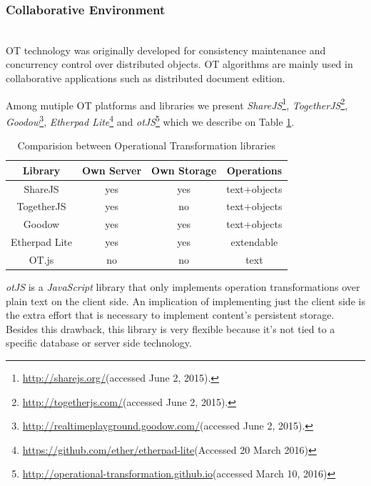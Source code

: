 \documentclass[conference,compsoc,a4paper]{IEEEtran}
\begin{document}
  \subsubsection{Collaborative Environment}\label{collabenv}~\\

        \gls{OT} technology was originally developed for consistency maintenance and concurrency control over distributed objects.
        \gls{OT} algorithms are mainly used in collaborative applications such as distributed document edition.

	Among mutiple \gls{OT} platforms and libraries we present \emph{ShareJS}\footnote{\url{http://sharejs.org/}(accessed June 2, 2015).}, \emph{TogetherJS}\footnote{\url{http://togetherjs.com/}(accessed June 2, 2015).}, \emph{Goodow}\footnote{\url{http://realtimeplayground.goodow.com/}(accessed June 2, 2015).}, \emph{Etherpad Lite}\footnote{\url{https://github.com/ether/etherpad-lite}(Accessed 20 March 2016)} and \emph{otJS}\footnote{\url{http://operational-transformation.github.io}(accessed March 10, 2016)} which we describe on Table \ref{table:otcomparision}.

\begin{table}
\centering
\caption{Comparision between Operational Transformation libraries}
\label{table:otcomparision}
\begin{tabular}{|c|c|c|c|}
\hline
\textbf{Library} & \textbf{Own Server} & \textbf{Own Storage} & \textbf{Operations} \\ \hline
ShareJS          & yes                 & yes                  & text+objects        \\ \hline
TogetherJS       & yes                 & no                   & text+objects        \\ \hline
Goodow           & yes                 & yes                  & text+objects        \\ \hline
Etherpad Lite    & yes                 & yes                  & extendable 			    \\ \hline
OT.js            & no                  & no                   & text                \\ \hline
\end{tabular}
\end{table}

	\emph{otJS} is a \emph{JavaScript} library that only implements operation transformations over plain text on the client side. An implication of implementing just the client side is the extra effort that is necessary to implement content's persistent storage. Besides this drawback, this library is very flexible because it's not tied to a specific database or server side technology.
        
\end{document}
